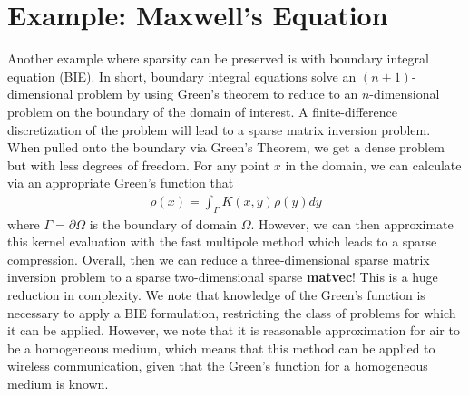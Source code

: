 \section{Example: Maxwell's Equation}
Another example where sparsity can be preserved is with boundary integral equation (BIE). In short, boundary integral equations solve an $(n+1)$-dimensional problem by using Green's theorem to reduce to an $n$-dimensional problem on the boundary of the domain of interest. A finite-difference discretization of the problem will lead to a sparse matrix inversion problem. When pulled onto the boundary via Green's Theorem, we get a dense problem but with less degrees of freedom. For any point $x$ in the domain, we can calculate via an appropriate Green's function that
\begin{align} \label{eqn:13:BIE}
    \rho(x) = \int_{\Gamma} K(x,y) \rho(y) dy
\end{align}
where $\Gamma = \partial \Omega$ is the boundary of domain $\Omega$. However, we can then approximate this kernel evaluation with the fast multipole method which leads to a sparse compression. Overall, then we can reduce a three-dimensional sparse matrix inversion problem to a sparse two-dimensional sparse \textbf{matvec}! This is a huge reduction in complexity. We note that knowledge of the Green's function is necessary to apply a BIE formulation, restricting the class of problems for which it can be applied. However, we note that it is reasonable approximation for air to be a homogeneous medium, which means that this method can be applied to wireless communication, given that the Green's function for a homogeneous medium is known.